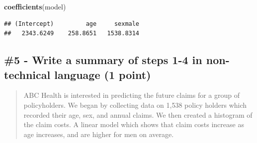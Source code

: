 \documentclass[]{book}
\newenvironment{Shaded}{\begin{snugshade}}{\end{snugshade}}
\newcommand{\KeywordTok}[1]{\textcolor[rgb]{0.13,0.29,0.53}{\textbf{#1}}}
\newcommand{\NormalTok}[1]{#1}
\begin{document}
\begin{Shaded}
\begin{Highlighting}[]
\KeywordTok{coefficients}\NormalTok{(model)}
\end{Highlighting}
\end{Shaded}

\begin{verbatim}
## (Intercept)         age     sexmale 
##   2343.6249    258.8651   1538.8314
\end{verbatim}

\hypertarget{write-a-summary-of-steps-1-4-in-non-technical-language-1-point}{%
\subsection{\#5 - Write a summary of steps 1-4 in non-technical language (1 point)}\label{write-a-summary-of-steps-1-4-in-non-technical-language-1-point}}

\begin{quote}
ABC Health is interested in predicting the future claims for a group of policyholders. We began by collecting data on 1,538 policy holders which recorded their age, sex, and annual claims. We then created a histogram of the claim costs. A linear model which shows that claim costs increase as age increases, and are higher for men on average.
\end{quote}


\end{document}
